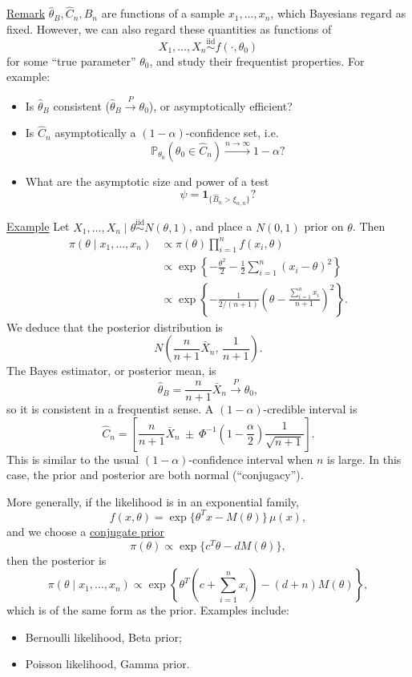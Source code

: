 \documentclass[11pt,a4paper]{article}
\begin{document}
\noindent\underline{Remark}\quad
$\hat\theta_B,\hat C_n,\hat B_n$ are functions of a sample
$x_1,\ldots,x_n$, which Bayesians regard as fixed.
However, we can also regard these quantities as functions of
\[
X_1,\ldots,X_n\overset{\mathrm{iid}}{\sim}f(\cdot,\theta_0)
\]
for some ``true parameter'' $\theta_0$, and study their frequentist properties.
For example:
\begin{itemize}
\item Is $\hat\theta_B$ consistent
($\hat\theta_B\xrightarrow{P}\theta_0$), or asymptotically efficient?
\item Is $\hat C_n$ asymptotically a $(1-\alpha)$-confidence set, i.e.
\[
\mathbb P_{\theta_0}(\theta_0\in\hat C_n)
\xrightarrow{n\to\infty}1-\alpha?
\]
\item What are the asymptotic size and power of a test
\[
\psi=\mathbf1_{\{\hat B_n>\xi_{\alpha,n}\}}?
\]
\end{itemize}

\medskip
\noindent\underline{Example}\quad
Let $X_1,\ldots,X_n\mid\theta\overset{\mathrm{iid}}{\sim}N(\theta,1)$,
and place a $N(0,1)$ prior on $\theta$. Then
\[
\begin{aligned}
\pi(\theta\mid x_1,\ldots,x_n)
&\propto\pi(\theta)\prod_{i=1}^n f(x_i,\theta)\\
&\propto\exp\left\{-\frac{\theta^2}{2}
-\frac12\sum_{i=1}^n(x_i-\theta)^2\right\}\\
&\propto\exp\left\{-\frac{1}{2/(n+1)}
\left(\theta-\frac{\sum_{i=1}^n x_i}{n+1}\right)^2\right\}.
\end{aligned}
\]
We deduce that the posterior distribution is
\[
N\left(\frac{n}{n+1}\bar X_n,\,\frac{1}{n+1}\right).
\]
The Bayes estimator, or posterior mean, is
\[
\hat\theta_B=\frac{n}{n+1}\bar X_n\xrightarrow{P}\theta_0,
\]
so it is consistent in a frequentist sense.
A $(1-\alpha)$-credible interval is
\[
\hat C_n=
\left[\frac{n}{n+1}\bar X_n
\ \pm\ \Phi^{-1}\left(1-\frac\alpha2\right)\frac1{\sqrt{n+1}}\right].
\]
This is similar to the usual $(1-\alpha)$-confidence interval when $n$ is large.
In this case, the prior and posterior are both normal (``conjugacy'').

More generally, if the likelihood is in an exponential family,
\[
f(x,\theta)=\exp\{\theta^T x-M(\theta)\}\,\mu(x),
\tag{$*$}
\]
and we choose a \underline{conjugate prior}
\[
\pi(\theta)\propto\exp\{c^T\theta-dM(\theta)\},
\tag{$**$}
\]
then the posterior is
\[
\pi(\theta\mid x_1,\ldots,x_n)
\propto\exp\left\{\theta^T\left(c+\sum_{i=1}^n x_i\right)
-(d+n)M(\theta)\right\},
\]
which is of the same form as the prior. Examples include:
\begin{itemize}
\item Bernoulli likelihood, Beta prior;
\item Poisson likelihood, Gamma prior.
\end{itemize}
\end{document}
